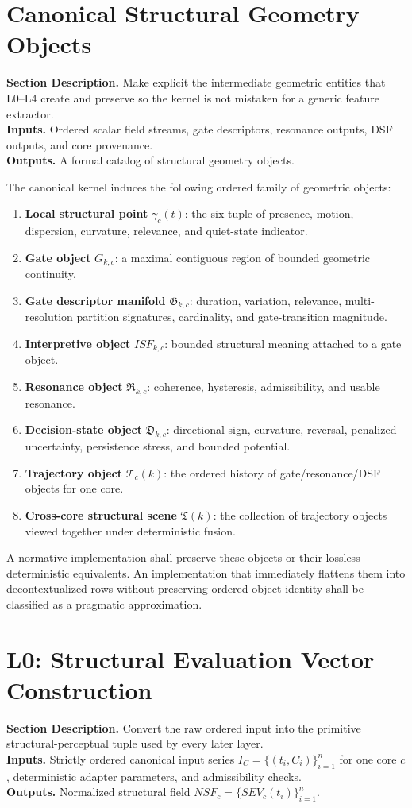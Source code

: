 \documentclass[11pt]{report}
\newcommand{\meta}[3]{\textbf{Section Description.} #1\\
\textbf{Inputs.} #2\\
\textbf{Outputs.} #3\par}
\begin{document}
\section{Canonical Structural Geometry Objects}
\meta{Make explicit the intermediate geometric entities that L0--L4 create and preserve so the kernel is not mistaken for a generic feature extractor.}{Ordered scalar field streams, gate descriptors, resonance outputs, DSF outputs, and core provenance.}{A formal catalog of structural geometry objects.}

The canonical kernel induces the following ordered family of geometric objects:
\begin{enumerate}[leftmargin=1.2cm]
    \item \textbf{Local structural point} $\gamma_c(t)$: the six-tuple of presence, motion, dispersion, curvature, relevance, and quiet-state indicator.
    \item \textbf{Gate object} $G_{k,c}$: a maximal contiguous region of bounded geometric continuity.
    \item \textbf{Gate descriptor manifold} $\mathfrak{G}_{k,c}$: duration, variation, relevance, multi-resolution partition signatures, cardinality, and gate-transition magnitude.
    \item \textbf{Interpretive object} $ISF_{k,c}$: bounded structural meaning attached to a gate object.
    \item \textbf{Resonance object} $\mathfrak{R}_{k,c}$: coherence, hysteresis, admissibility, and usable resonance.
    \item \textbf{Decision-state object} $\mathfrak{D}_{k,c}$: directional sign, curvature, reversal, penalized uncertainty, persistence stress, and bounded potential.
    \item \textbf{Trajectory object} $\mathcal{T}_{c}(k)$: the ordered history of gate/resonance/DSF objects for one core.
    \item \textbf{Cross-core structural scene} $\mathfrak{T}(k)$: the collection of trajectory objects viewed together under deterministic fusion.
\end{enumerate}

A normative implementation shall preserve these objects or their lossless deterministic equivalents. An implementation that immediately flattens them into decontextualized rows without preserving ordered object identity shall be classified as a pragmatic approximation.

\section{L0: Structural Evaluation Vector Construction}
\meta{Convert the raw ordered input into the primitive structural-perceptual tuple used by every later layer.}{Strictly ordered canonical input series $I_C=\{(t_i,C_i)\}_{i=1}^{n}$ for one core $c$, deterministic adapter parameters, and admissibility checks.}{Normalized structural field $NSF_c = \{SEV_c(t_i)\}_{i=1}^{n}$.}
\end{document}
